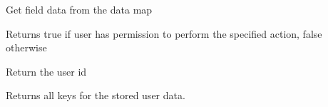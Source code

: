 \documentclass[letterpaper,10pt,english]{sphinxmanual}
\begin{document}
\begin{fulllineitems}
\begin{fulllineitems}
\end{fulllineitems}


\begin{fulllineitems}
\label{knop_user:knop_user.getdata}
Get field data from the data map

\end{fulllineitems}


\begin{fulllineitems}
\label{knop_user:knop_user.getpermission}
Returns true if user has permission to perform the specified action, false otherwise

\end{fulllineitems}


\begin{fulllineitems}
\label{knop_user:knop_user.groups}
\end{fulllineitems}



\begin{fulllineitems}
\end{fulllineitems}


\begin{fulllineitems}
\label{knop_user:knop_user.id_user}
Return the user id

\end{fulllineitems}



\begin{fulllineitems}
\end{fulllineitems}


\begin{fulllineitems}
\label{knop_user:knop_user.keys}
Returns all keys for the stored user data.


\end{fulllineitems}
\end{fulllineitems}
\end{document}
